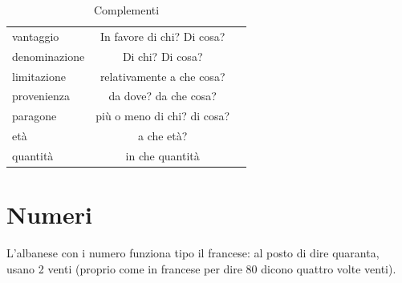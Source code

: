 \begin{table}[H]
\begin{tabular}{lcr}
        vantaggio           & In favore di chi? Di cosa?    &\\
        denominazione       & Di chi? Di cosa?              &\\
        limitazione         & relativamente a che cosa?     &\\
        provenienza         & da dove? da che cosa?         &\\
        paragone            & più o meno di chi? di cosa?   &\\
        età                 & a che età?                    &\\
        quantità            & in che quantità               &\\
        \bottomrule
    \end{tabular}
    \caption{Complementi}
    \label{tbl:complementi}
\end{table}

\section{Numeri}

\begin{note}
    L'albanese con i numero funziona tipo il francese: al posto di dire quaranta, usano 2 venti (proprio come in francese per dire 80 dicono quattro volte venti).
\end{note}

